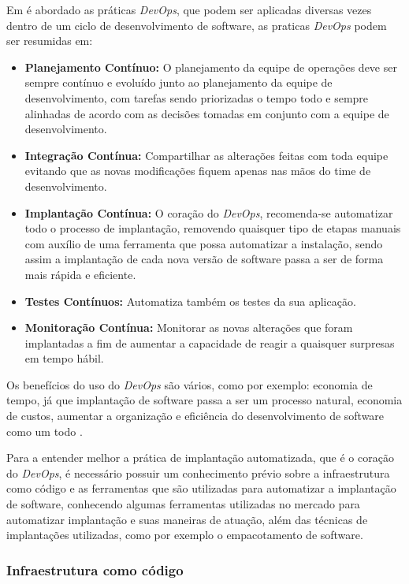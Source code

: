 Em  é abordado as práticas \textit{DevOps}, que podem ser aplicadas diversas
 vezes dentro de um ciclo de desenvolvimento de software, as praticas \textit{DevOps} podem ser resumidas em:

 \begin{itemize}
   \item \textbf{Planejamento Contínuo:} O planejamento da equipe de operações 
deve ser sempre contínuo
   e evoluído junto ao planejamento da equipe de desenvolvimento, com tarefas
   sendo priorizadas o tempo todo e sempre alinhadas de acordo com as decisões tomadas
   em conjunto com a equipe de desenvolvimento.
   \item \textbf{Integração Contínua:} Compartilhar as alterações feitas com toda equipe
   evitando que as novas modificações fiquem apenas nas mãos do time de desenvolvimento.
   \item \textbf{Implantação Contínua:} O coração do \textit{DevOps}, recomenda-se automatizar
   todo o processo de implantação, removendo quaisquer tipo de etapas manuais com auxílio
   de uma ferramenta que possa automatizar a instalação, sendo assim a implantação
   de cada nova versão de software passa a ser de forma mais rápida e eficiente.
   \item \textbf{Testes Contínuos:} Automatiza também os testes da sua aplicação.
   \item \textbf{Monitoração Contínua:} Monitorar as novas alterações
   que foram implantadas a fim de aumentar a capacidade de reagir a quaisquer surpresas
   em tempo hábil.
 \end{itemize}

 Os benefícios do uso do \textit{DevOps} são vários, como por exemplo: economia de tempo,
 já que implantação de software passa a ser um processo natural, economia de custos, aumentar
 a organização e eficiência do desenvolvimento de software como um todo \cite{7173368}.

Para a entender melhor a prática de implantação automatizada, que é o coração
do \textit{DevOps}, é necessário possuir um conhecimento prévio sobre  a infraestrutura
como código e as ferramentas que são utilizadas para
automatizar a implantação de software, conhecendo algumas ferramentas utilizadas
no mercado para automatizar implantação e suas maneiras de atuação, além das técnicas
de implantações utilizadas, como por exemplo o empacotamento de software.

\subsubsection{Infraestrutura como código}

